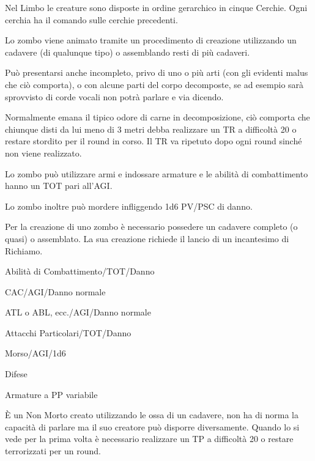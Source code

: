 Nel Limbo le creature sono disposte in ordine gerarchico in cinque
Cerchie. Ogni cerchia ha il comando sulle cerchie precedenti.


Lo zombo viene animato tramite un procedimento di creazione
utilizzando un cadavere (di qualunque tipo) o assemblando resti di
pi\`u cadaveri.

Pu\`o presentarsi anche incompleto, privo di uno o pi\`u arti (con
gli evidenti malus che ci\`o comporta), o con alcune parti del corpo
decomposte, se ad esempio sar\`a sprovvisto di corde vocali non
potr\`a parlare e via dicendo. 

Normalmente emana il tipico odore di carne in decomposizione, ci\`o
comporta che chiunque disti da lui meno di 3 metri debba realizzare un
TR a difficolt\`a 20 o restare stordito per il round in corso. Il TR
va ripetuto dopo ogni round sinch\'e non viene realizzato.

Lo zombo pu\`o utilizzare armi e indossare armature e le abilit\`a
di combattimento hanno un TOT pari all'AGI.

Lo zombo inoltre pu\`o mordere infliggendo 1d6 PV/PSC di danno.

Per la creazione di uno zombo \`e necessario
possedere un cadavere completo (o quasi) o assemblato. La sua
creazione richiede il lancio di un incantesimo di Richiamo.


\begin{parmostro}{Abilit\`a di Combattimento/TOT/Danno}
\item CAC/AGI/Danno normale
\item  ATL o ABL, ecc./AGI/Danno normale
\end{parmostro}

\begin{parmostro}{Attacchi Particolari/TOT/Danno}
\item  Morso/AGI/1d6
\end{parmostro}

\begin{parmostro}{Difese}
\item Armature a PP variabile
\end{parmostro}


\`E un Non Morto creato utilizzando le ossa di un cadavere, non ha di
norma la capacit\`a di parlare ma il suo creatore pu\`o disporre
diversamente.  Quando lo si vede per la prima volta \`e necessario
realizzare un TP a difficolt\`a 20 o restare terrorizzati per un
round. 

